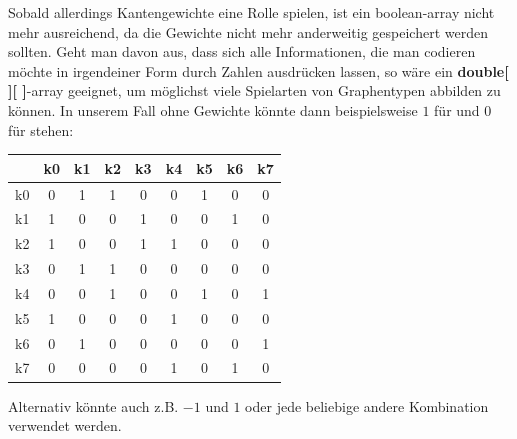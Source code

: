 \documentclass{article}
\begin{document}
Sobald allerdings Kantengewichte eine Rolle spielen, ist ein boolean-array nicht mehr ausreichend, da die Gewichte nicht mehr anderweitig gespeichert werden sollten. Geht man davon aus, dass sich alle Informationen, die man codieren möchte in irgendeiner Form durch Zahlen ausdrücken lassen, so wäre ein \textbf{double[ ][ ]}-array geeignet, um möglichst viele Spielarten von Graphentypen abbilden zu können. In unserem Fall ohne Gewichte könnte dann beispielsweise $1$ für  und $0$ für  stehen: 

\begin{center}
    \begin{tabular}{|c|c|c|c|c|c|c|c|c|}
        \hline 
            & k0 & k1 & k2 & k3 & k4 & k5 & k6 & k7  \\
        \hline 
        k0 & \color{red} 0 & \color{green} 1 & \color{green} 1 & \color{red} 0&\color{red} 0 & \color{green} 1& \color{red} 0& \color{red} 0\\
        \hline 
        k1 & \color{green} 1 & \color{red} 0& \color{red} 0&\color{green} 1 &\color{red} 0 & \color{red} 0& \color{green} 1&\color{red} 0\\
        \hline 
        k2 &  \color{green} 1 & \color{red} 0& \color{red} 0& \color{green} 1& \color{green} 1& \color{red} 0& \color{red} 0&\color{red} 0\\
        \hline 
        k3 & \color{red} 0&\color{green} 1  & \color{green} 1  & \color{red} 0& \color{red} 0& \color{red} 0& \color{red} 0&\color{red} 0\\
        \hline 
        k4 &\color{red} 0 & \color{red} 0& \color{green} 1 & \color{red} 0& \color{red} 0&\color{green} 1 & \color{red} 0& \color{green} 1\\
        \hline 
        k5 & \color{green} 1 & \color{red} 0& \color{red} 0&\color{red} 0 & \color{green} 1  & \color{red} 0& \color{red} 0&\color{red} 0\\
        \hline 
        k6 &\color{red} 0 & \color{green} 1 & \color{red} 0& \color{red} 0& \color{red} 0& \color{red} 0&\color{red} 0 & \color{green} 1\\
        \hline 
        k7 & \color{red} 0& \color{red} 0&\color{red} 0 &\color{red} 0 &\color{green} 1  & \color{red} 0& \color{green} 1  &\color{red} 0 \color{black}\\
        \hline 
    \end{tabular} 
    \end{center}
Alternativ könnte auch z.B. $-1$ und $1$ oder jede beliebige andere Kombination verwendet werden. \\
\end{document}
